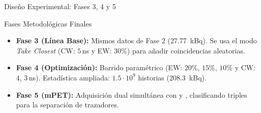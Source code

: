 \documentclass[aspectratio=169]{beamer}
\newcommand{\yochoseis}{\ce{^{86}Y}\xspace}
\newcommand{\fdiezocho}{\ce{^{18}F}\xspace}
\newcommand{\ingles}[1]{\textit{#1}\xspace}
\begin{document}
\begin{frame}{Diseño Experimental: Fases 3, 4 y 5}
    \begin{block}{Fases Metodológicas Finales}
        \begin{itemize}\setlength{\itemsep}{0.8em}
            \item \textbf{Fase 3 (Línea Base):} Mismos datos de Fase 2 (\SI{27.77}{\kilo\becquerel}). Se usa el modo \ingles{Take Closest} (CW: $5$\,ns y EW: $30\%$) para añadir coincidencias aleatorias.
            \item \textbf{Fase 4 (Optimización):} Barrido paramétrico (EW: $20\%$, $15\%$, $10\%$ y CW: $4$, $3$\,ns). \alert{Estadística ampliada:} $1.5 \cdot 10^9$ historias (\SI{208.3}{\kilo\becquerel}).
            \item \textbf{Fase 5 (mPET):} Adquisición dual simultánea con \fdiezocho y \yochoseis, clasificando triples para la separación de trazadores.
        \end{itemize}
    \end{block}
\end{frame}
\end{document}
